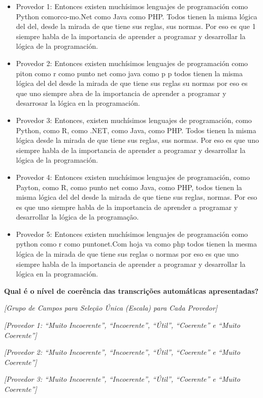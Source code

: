 \begin{itemize}
    \item Provedor 1: Entonces existen muchísimos lenguajes de programación como Python comorco-mo.Net como Java como PHP. Todos tienen la misma lógica del del, desde la mirada de que tiene sus reglas, sus normas. Por eso es que 1 siempre habla de la importancia de aprender a programar y desarrollar la lógica de la programación.
    \item Provedor 2: Entonces existen muchísimos lenguajes de programación como piton como r como punto net como java como p p todos tienen la misma lógica del del desde la mirada de que tiene sus reglas su normas por eso es que uno siempre abra de la importancia de aprender a programar y desarrosar la lógica en la programación.
    \item Provedor 3: Entonces, existen muchísimos lenguajes de programación, como Python, como R, como .NET, como Java, como PHP. Todos tienen la misma lógica desde la mirada de que tiene sus reglas, sus normas. Por eso es que uno siempre habla de la importancia de aprender a programar y desarrollar la lógica de la programación.
    \item Provedor 4: Entonces existen muchísimos lenguajes de programación, como Payton, como R, como punto net como Java, como PHP, todos tienen la misma lógica del del desde la mirada de que tiene sus reglas, normas. Por eso es que uno siempre habla de la importancia de aprender a programar y desarrollar la lógica de la programação.
    \item Provedor 5: Entonces existen muchísimos lenguajes de programación como python como r como puntonet.Com hoja va como php todos tienen la mesma lógica de la mirada de que tiene sus reglas o normas por eso es que uno siempre habla de la importancia de aprender a programar y desarrollar la lógica en la programación.
\end{itemize}

\noindent
\textbf{Qual é o nível de coerência das transcrições automáticas apresentadas?}

\noindent
\textit{[Grupo de Campos para Seleção Única (Escala) para Cada Provedor]}

\noindent
\textit{[Provedor 1: ``Muito Incoerente'', ``Incoerente'', ``Útil'', ``Coerente'' e ``Muito Coerente'']}

\noindent
\textit{[Provedor 2: ``Muito Incoerente'', ``Incoerente'', ``Útil'', ``Coerente'' e ``Muito Coerente'']}

\noindent
\textit{[Provedor 3: ``Muito Incoerente'', ``Incoerente'', ``Útil'', ``Coerente'' e ``Muito Coerente'']}


